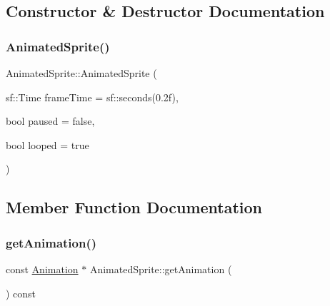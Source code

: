 \subsection{Constructor \& Destructor Documentation}
\hypertarget{class_animated_sprite_a097ab8444824e7085d71a1f7144e7763}{}\label{class_animated_sprite_a097ab8444824e7085d71a1f7144e7763} 
\subsubsection{\texorpdfstring{Animated\+Sprite()}{AnimatedSprite()}}
{\footnotesize\ttfamily Animated\+Sprite\+::\+Animated\+Sprite (\begin{DoxyParamCaption}\item[{sf\+::\+Time}]{frame\+Time = {\ttfamily sf\+:\+:seconds(0.2f)},  }\item[{bool}]{paused = {\ttfamily false},  }\item[{bool}]{looped = {\ttfamily true} }\end{DoxyParamCaption})\hspace{0.3cm}{\ttfamily [explicit]}}



\subsection{Member Function Documentation}
\hypertarget{class_animated_sprite_a03bacdbaf638cb6f7987e342980206c2}{}\label{class_animated_sprite_a03bacdbaf638cb6f7987e342980206c2} 
\subsubsection{\texorpdfstring{get\+Animation()}{getAnimation()}}
{\footnotesize\ttfamily const \hyperlink{class_animation}{Animation} $\ast$ Animated\+Sprite\+::get\+Animation (\begin{DoxyParamCaption}{ }\end{DoxyParamCaption}) const}

\hypertarget{class_animated_sprite_a8e929c48b0ca713b7aac7dd769e4f00c}{}\label{class_animated_sprite_a8e929c48b0ca713b7aac7dd769e4f00c} 
